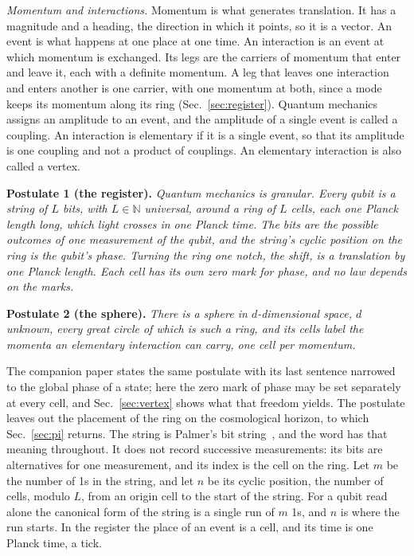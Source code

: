\documentclass[aps,prd,twocolumn,superscriptaddress,nofootinbib]{revtex4-2}
\begin{document}
\textit{Momentum and interactions.} Momentum is what generates translation. It has a magnitude and a heading, the direction in which it points, so it is a vector. An event is what happens at one place at one time. An interaction is an event at which momentum is exchanged. Its legs are the carriers of momentum that enter and leave it, each with a definite momentum. A leg that leaves one interaction and enters another is one carrier, with one momentum at both, since a mode keeps its momentum along its ring (Sec.~\ref{sec:register}). Quantum mechanics assigns an amplitude to an event, and the amplitude of a single event is called a coupling. An interaction is elementary if it is a single event, so that its amplitude is one coupling and not a product of couplings. An elementary interaction is also called a vertex.

\textbf{Postulate 1 (the register).} \emph{Quantum mechanics is granular. Every qubit is a string of $L$ bits, with $L\in\mathbb{N}$ universal, around a ring of $L$ cells, each one Planck length long, which light crosses in one Planck time. The bits are the possible outcomes of one measurement of the qubit, and the string's cyclic position on the ring is the qubit's phase. Turning the ring one notch, the shift, is a translation by one Planck length. Each cell has its own zero mark for phase, and no law depends on the marks.}

\textbf{Postulate 2 (the sphere).} \emph{There is a sphere in $d$-dimensional space, $d$ unknown, every great circle of which is such a ring, and its cells label the momenta an elementary interaction can carry, one cell per momentum.}

The companion paper states the same postulate with its last sentence narrowed to the global phase of a state; here the zero mark of phase may be set separately at every cell, and Sec.~\ref{sec:vertex} shows what that freedom yields. The postulate leaves out the placement of the ring on the cosmological horizon, to which Sec.~\ref{sec:pi} returns. The string is Palmer's bit string~\cite{palmer2026}, and the word has that meaning throughout. It does not record successive measurements: its bits are alternatives for one measurement, and its index is the cell on the ring. Let $m$ be the number of 1s in the string, and let $n$ be its cyclic position, the number of cells, modulo $L$, from an origin cell to the start of the string. For a qubit read alone the canonical form of the string is a single run of $m$ 1s, and $n$ is where the run starts. In the register the place of an event is a cell, and its time is one Planck time, a tick.
\end{document}

